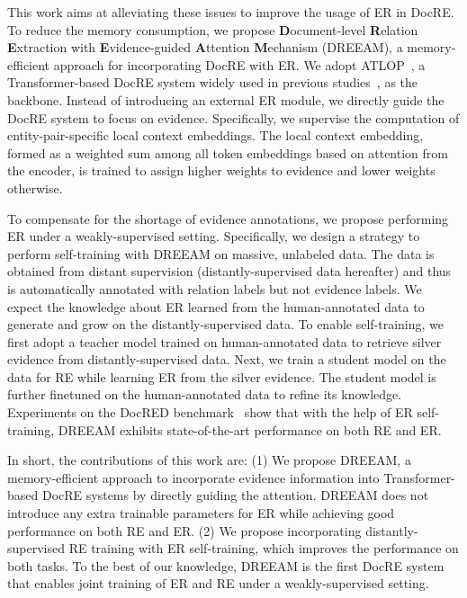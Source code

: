 \documentclass[11pt]{article}
\begin{document}
This work aims at alleviating these issues to improve the usage of ER in DocRE.
To reduce the memory consumption, we propose \textbf{D}ocument-level \textbf{R}elation \textbf{E}xtraction with \textbf{E}vidence-guided \textbf{A}ttention \textbf{M}echanism (DREEAM), a memory-efficient approach for incorporating DocRE with ER.
We adopt ATLOP~\cite{zhou2021atlop}, a Transformer-based DocRE system widely used in previous studies~\cite{xie-etal-2022-eider,tan-etal-2022-document,xiao-etal-2022-sais}, as the backbone.
Instead of introducing an external ER module, we directly guide the DocRE system to focus on evidence.
Specifically, we supervise the computation of entity-pair-specific local context embeddings.
The local context embedding, formed as a weighted sum among all token embeddings based on attention from the encoder, is trained to assign higher weights to evidence and lower weights otherwise.

To compensate for the shortage of evidence annotations, we propose performing ER under a weakly-supervised setting.
Specifically, we design a strategy to perform self-training with DREEAM on massive, unlabeled data.
The data is obtained from distant supervision (distantly-supervised data hereafter) and thus is automatically annotated with relation labels but not evidence labels.
We expect the knowledge about ER learned from the human-annotated data to generate and grow on the distantly-supervised data.
To enable self-training, we first adopt a teacher model trained on human-annotated data to retrieve silver evidence from distantly-supervised data.
Next, we train a student model on the data for RE while learning ER from the silver evidence.
The student model is further finetuned on the human-annotated data to refine its knowledge.
Experiments on the DocRED benchmark~\cite{yao-etal-2019-docred} show that with the help of ER self-training, DREEAM exhibits state-of-the-art performance on both RE and ER.

In short, the contributions of this work are: (1) We propose DREEAM, a memory-efficient approach to incorporate evidence information into Transformer-based DocRE systems by directly guiding the attention.
DREEAM does not introduce any extra trainable parameters for ER while achieving good performance on both RE and ER.
(2) We propose incorporating distantly-supervised RE training with ER self-training, which improves the performance on both tasks. 
To the best of our knowledge, DREEAM is the first DocRE system that enables joint training of ER and RE under a weakly-supervised setting. 
\end{document}
